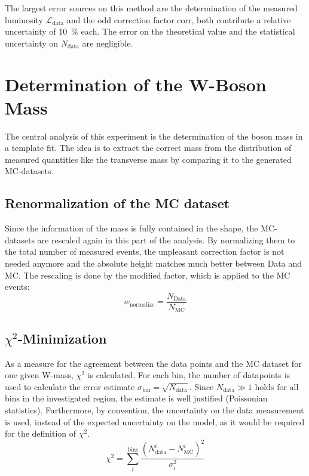 \documentclass[
	paper=A4,
	parskip=full,
	chapterprefix=true,
	11pt,
	headings=normal,
	bibliography=totoc,
	listof=totoc,
	titlepage=on,
]{scrreprt}
\begin{document}
The largest error sources on this method are the determination of the measured luminosity $\mathcal{L}_\mathrm{data}$ and the odd correction factor $\mathrm{corr}$, both contribute a relative uncertainty of \SI{10}{\percent} each. The error on the theoretical value and the statistical uncertainty on $N_\mathrm{data}$ are negligible.

\chapter{Determination of the W-Boson Mass}
The central analysis of this experiment is the determination of the \PW boson mass in a template fit. The idea is to extract the correct \PW mass from the distribution of measured quantities like the transverse mass by comparing it to the generated MC-datasets. 


\section{Renormalization of the MC dataset}
Since the information of the \PW mass is fully contained in the shape, the MC-datasets are rescaled again in this part of the analysis. By normalizing them to the total number of measured events, the unpleasant correction factor is not needed anymore and the absolute height matches much better between Data and MC. The rescaling is done by the modified factor, which is applied to the MC events:
\begin{equation}
w_{\mathrm{normalize}}=\frac{N_{\mathrm{Data}}}{N_{\mathrm{MC}}}
\end{equation}

\section{$\chi^2$-Minimization}
As a measure for the agreement between the data points and the MC dataset for one given W-mass, $\chi^2$ is calculated. For each bin, the number of datapoints is used to calculate the error estimate $\sigma_\mathrm{bin}=\sqrt{N_\mathrm{data}}$. Since $N_\mathrm{data} \gg 1$ holds for all bins in the investigated region, the estimate is well justified (Poissonian statistics). Furthermore, by convention, the uncertainty on the data measurement is used, instead of the expected uncertainty on the model, as it would be required for the definition of $\chi^2$. 
\begin{equation}
\chi^2=\sum_i^{\mathrm{bins}} \frac{\left(N^i_\mathrm{data}-N^i_\mathrm{MC}\right)^2}{\sigma_i^2}
\label{eq:Chi2}
\end{equation}
\end{document}
